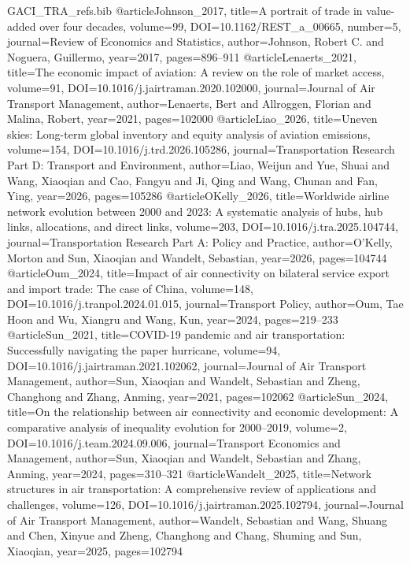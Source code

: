 \begin{filecontents*}[overwrite]{GACI_TRA_refs.bib}
@article{Johnson_2017, title={A portrait of trade in value-added over four decades}, volume={99}, DOI={10.1162/REST_a_00665}, number={5}, journal={Review of Economics and Statistics}, author={Johnson, Robert C. and Noguera, Guillermo}, year={2017}, pages={896--911} }
@article{Lenaerts_2021, title={The economic impact of aviation: A review on the role of market access}, volume={91}, DOI={10.1016/j.jairtraman.2020.102000}, journal={Journal of Air Transport Management}, author={Lenaerts, Bert and Allroggen, Florian and Malina, Robert}, year={2021}, pages={102000} }
@article{Liao_2026, title={Uneven skies: Long-term global inventory and equity analysis of aviation emissions}, volume={154}, DOI={10.1016/j.trd.2026.105286}, journal={Transportation Research Part D: Transport and Environment}, author={Liao, Weijun and Yue, Shuai and Wang, Xiaoqian and Cao, Fangyu and Ji, Qing and Wang, Chunan and Fan, Ying}, year={2026}, pages={105286} }
@article{OKelly_2026, title={Worldwide airline network evolution between 2000 and 2023: A systematic analysis of hubs, hub links, allocations, and direct links}, volume={203}, DOI={10.1016/j.tra.2025.104744}, journal={Transportation Research Part A: Policy and Practice}, author={O'Kelly, Morton and Sun, Xiaoqian and Wandelt, Sebastian}, year={2026}, pages={104744} }
@article{Oum_2024, title={Impact of air connectivity on bilateral service export and import trade: The case of China}, volume={148}, DOI={10.1016/j.tranpol.2024.01.015}, journal={Transport Policy}, author={Oum, Tae Hoon and Wu, Xiangru and Wang, Kun}, year={2024}, pages={219--233} }
@article{Sun_2021, title={COVID-19 pandemic and air transportation: Successfully navigating the paper hurricane}, volume={94}, DOI={10.1016/j.jairtraman.2021.102062}, journal={Journal of Air Transport Management}, author={Sun, Xiaoqian and Wandelt, Sebastian and Zheng, Changhong and Zhang, Anming}, year={2021}, pages={102062} }
@article{Sun_2024, title={On the relationship between air connectivity and economic development: A comparative analysis of inequality evolution for 2000--2019}, volume={2}, DOI={10.1016/j.team.2024.09.006}, journal={Transport Economics and Management}, author={Sun, Xiaoqian and Wandelt, Sebastian and Zhang, Anming}, year={2024}, pages={310--321} }
@article{Wandelt_2025, title={Network structures in air transportation: A comprehensive review of applications and challenges}, volume={126}, DOI={10.1016/j.jairtraman.2025.102794}, journal={Journal of Air Transport Management}, author={Wandelt, Sebastian and Wang, Shuang and Chen, Xinyue and Zheng, Changhong and Chang, Shuming and Sun, Xiaoqian}, year={2025}, pages={102794} }

\end{filecontents*}
